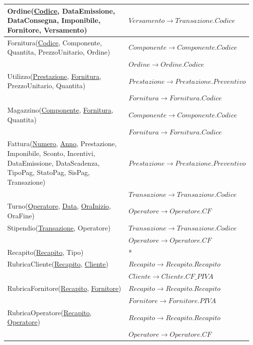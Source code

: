 \begin{longtable}{| p{8cm} | p{6.5cm} |}
			\hline
			Ordine(\underline{Codice}, DataEmissione, DataConsegna, Imponibile, Fornitore, Versamento) &
			$Versamento \rightarrow Transazione.Codice$ \\
			\hline
			Fornitura(\underline{Codice}, Componente, Quantita, PrezzoUnitario, Ordine) &
			$Componente \rightarrow Componente.Codice$ \\
			& $Ordine \rightarrow Ordine.Codice$ \\
			\hline
			Utilizzo(\underline{Prestazione}, \underline{Fornitura}, PrezzoUnitario, Quantita) &
			$Prestazione \rightarrow Prestazione.Preventivo$ \\
			& $Fornitura \rightarrow Fornitura.Codice$ \\
			\hline
			Magazzino(\underline{Componente}, \underline{Fornitura}, Quantita) &
			$Componente \rightarrow Componente.Codice$ \\
			& $Fornitura \rightarrow Fornitura.Codice$ \\
			\hline
			Fattura(\underline{Numero}, \underline{Anno}, Prestazione, Imponibile, Sconto, Incentivi, DataEmissione, DataScadenza, TipoPag, StatoPag, SisPag, Transazione) &
			$Prestazione \rightarrow Prestazione.Preventivo$ \\
			& $Transazione \rightarrow Transazione.Codice$ \\
			\hline
			Turno(\underline{Operatore}, \underline{Data}, \underline{OraInizio}, OraFine) &
			$Operatore \rightarrow Operatore.CF$ \\
			\hline
			Stipendio(\underline{Transazione}, Operatore) &
			$Transazione \rightarrow Transazione.Codice$ \\
			& $Operatore \rightarrow Operatore.CF$ \\
			\hline
			Recapito(\underline{Recapito}, Tipo) &
			* \\ \hline
			RubricaCliente(\underline{Recapito}, \underline{Cliente}) &
			$Recapito \rightarrow Recapito.Recapito$ \\
			& $Cliente \rightarrow Cliente.CF\_PIVA$ \\
			\hline
			RubricaFornitore(\underline{Recapito}, \underline{Fornitore}) &
			$Recapito \rightarrow Recapito.Recapito$ \\
			& $Fornitore \rightarrow Fornitore.PIVA$ \\
			\hline
			RubricaOperatore(\underline{Recapito}, \underline{Operatore}) &
			$Recapito \rightarrow Recapito.Recapito$ \\
			& $Operatore \rightarrow Operatore.CF$ \\
			\hline

		\end{longtable}
	\vspace{2ex}